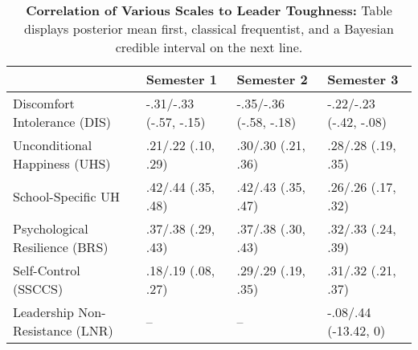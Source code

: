 \begin{table}[ht]
\centering
\begin{tabular}{llll}
  \hline
 & Semester 1 & Semester 2 & Semester 3 \\ 
  \hline
Discomfort Intolerance (DIS) & -.31/-.33 (-.57, -.15) & -.35/-.36 (-.58, -.18) & -.22/-.23 (-.42, -.08) \\ 
  Unconditional Happiness (UHS) & .21/.22 (.10, .29) & .30/.30 (.21, .36) & .28/.28 (.19, .35) \\ 
  School-Specific UH & .42/.44 (.35, .48) & .42/.43 (.35, .47) & .26/.26 (.17, .32) \\ 
  Psychological Resilience (BRS) & .37/.38 (.29, .43) & .37/.38 (.30, .43) & .32/.33 (.24, .39) \\ 
  Self-Control (SSCCS) & .18/.19 (.08, .27) & .29/.29 (.19, .35) & .31/.32 (.21, .37) \\ 
  Leadership Non-Resistance (LNR) & -- & -- & -.08/.44 (-13.42, 0) \\ 
   \hline
\end{tabular}
\caption{\textbf{Correlation of Various Scales to Leader Toughness:} Table displays posterior mean first, classical frequentist, and a Bayesian credible interval on the next line.} 
\label{tab:edc_corr}
\end{table}
